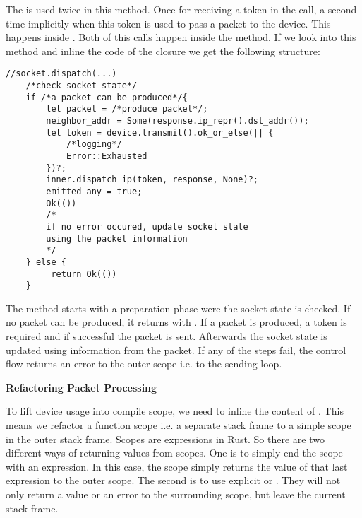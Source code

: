  The \dev{} is used twice in this method. Once for receiving a token in the  call, a second time implicitly when this token is used to pass a packet to the device. This happens inside . Both of this calls happen inside the  method. If we look into this method and inline the code of the  closure we get the following structure: 
 
\begin{verbatim}
//socket.dispatch(...)
    /*check socket state*/
    if /*a packet can be produced*/{
        let packet = /*produce packet*/;
        neighbor_addr = Some(response.ip_repr().dst_addr());
        let token = device.transmit().ok_or_else(|| {
            /*logging*/
            Error::Exhausted
        })?;
        inner.dispatch_ip(token, response, None)?;
        emitted_any = true;
        Ok(())
        /* 
        if no error occured, update socket state
        using the packet information        
        */
    } else {
         return Ok(())
    }                    
\end{verbatim}

The method starts with a preparation phase were the socket state is checked. If no packet can be produced, it returns with . If a packet is produced, a token is required and if successful the packet is sent.  Afterwards the socket state is updated using information from the packet. If any of the steps fail, the control flow returns an error to the outer scope i.e. to the sending loop. 

\textbf{Refactoring Packet Processing}

To lift device usage into compile scope, we need to inline the content of . This means we refactor a function scope i.e. a separate stack frame to a simple scope in the outer stack frame. Scopes are expressions in Rust. So there are two different ways of returning values from scopes. One is to simply end the scope with an expression. In this case, the scope simply returns the value of that last expression to the outer scope. The second is to use explicit  or . They will not only return a value or an error to the surrounding scope, but leave the current stack frame. \\


